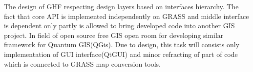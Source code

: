 \documentclass[a4paper,12pt,oneside]{report}
\begin{document}
	The design of GHF respecting design layers based on interfaces hierarchy. The fact that core API is implemented independently on GRASS  and middle interface is dependent only partly is allowed to bring developed code into another GIS project. In field of open source free GIS open room for developing similar framework for Quantum GIS(QGis). Due to design, this task will consists only implementation of GUI interface(QtGUI) and minor refracting of part of code which is connected to GRASS map conversion tools.


	
	
	\chapter*{}
		\listoffigures
		 
		\listoftables
	
	
\end{document}
